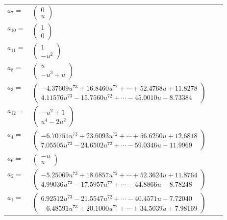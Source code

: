 \documentclass[1p]{elsarticle_modified}
\theoremstyle{definition}
\begin{document}
\begin{tabular}{m{7pt} m{180pt} m{7pt} m{180pt} }
\flushright $a_{7}=$&$\begin{pmatrix}0\\u\end{pmatrix}$ \\
\flushright $a_{10}=$&$\begin{pmatrix}1\\0\end{pmatrix}$ \\
\flushright $a_{11}=$&$\begin{pmatrix}1\\- u^2\end{pmatrix}$ \\
\flushright $a_{8}=$&$\begin{pmatrix}u\\- u^3+u\end{pmatrix}$ \\
\flushright $a_{3}=$&$\begin{pmatrix}-4.37609 u^{73}+16.8460 u^{72}+\cdots+52.4768 u+11.8278\\4.11576 u^{73}-15.7560 u^{72}+\cdots-45.0010 u-8.73384\end{pmatrix}$ \\
\flushright $a_{12}=$&$\begin{pmatrix}- u^2+1\\u^4-2 u^2\end{pmatrix}$ \\
\flushright $a_{4}=$&$\begin{pmatrix}-6.70751 u^{73}+23.6093 u^{72}+\cdots+56.6250 u+12.6818\\7.05505 u^{73}-24.6502 u^{72}+\cdots-59.0346 u-11.9969\end{pmatrix}$ \\
\flushright $a_{6}=$&$\begin{pmatrix}- u\\u\end{pmatrix}$ \\
\flushright $a_{2}=$&$\begin{pmatrix}-5.25069 u^{73}+18.6857 u^{72}+\cdots+52.3624 u+11.8764\\4.99036 u^{73}-17.5957 u^{72}+\cdots-44.8866 u-8.78248\end{pmatrix}$ \\
\flushright $a_{1}=$&$\begin{pmatrix}6.92512 u^{73}-21.5547 u^{72}+\cdots-40.4571 u-7.72040\\-6.48591 u^{73}+20.1000 u^{72}+\cdots+34.5039 u+7.98169\end{pmatrix}$ \\

\end{tabular}
\end{document}
